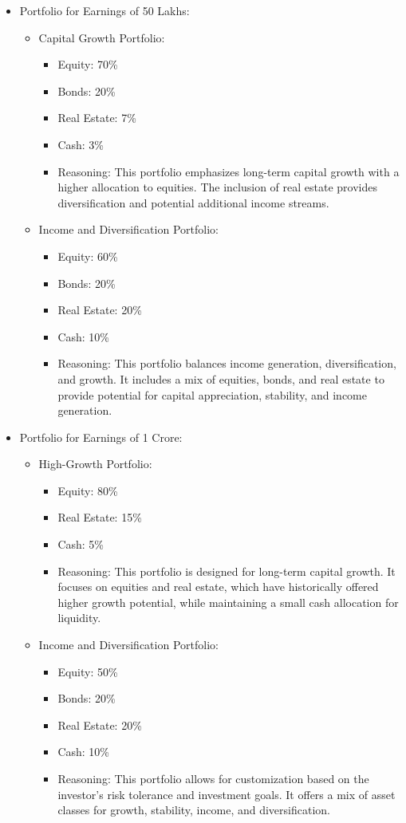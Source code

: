\begin{itemize}
  \item Portfolio for Earnings of 50 Lakhs:
  \begin{itemize}
    \item Capital Growth Portfolio:
    \begin{itemize}
      \item Equity: 70\%
      \item Bonds: 20\%
      \item Real Estate: 7\%
      \item Cash: 3\%
      \item Reasoning: This portfolio emphasizes long-term capital growth with a higher allocation to equities. The inclusion of real estate provides diversification and potential additional income streams.
    \end{itemize}
    \item Income and Diversification Portfolio:
    \begin{itemize}
      \item Equity: 60\%
      \item Bonds: 20\%
      \item Real Estate: 20\%
      \item Cash: 10\%
      \item Reasoning: This portfolio balances income generation, diversification, and growth. It includes a mix of equities, bonds, and real estate to provide potential for capital appreciation, stability, and income generation.
    \end{itemize}
  \end{itemize}
  
  \item Portfolio for Earnings of 1 Crore:
  \begin{itemize}
    \item High-Growth Portfolio:
    \begin{itemize}
      \item Equity: 80\%
      \item Real Estate: 15\%
      \item Cash: 5\%
      \item Reasoning: This portfolio is designed for long-term capital growth. It focuses on equities and real estate, which have historically offered higher growth potential, while maintaining a small cash allocation for liquidity.
    \end{itemize}
    \item Income and Diversification Portfolio:
    \begin{itemize}
      \item Equity: 50\%
      \item Bonds: 20\%
      \item Real Estate: 20\%
      \item Cash: 10\%
      \item Reasoning: This portfolio allows for customization based on the investor's risk tolerance and investment goals. It offers a mix of asset classes for growth, stability, income, and diversification.
    \end{itemize}
  \end{itemize}
\end{itemize}

